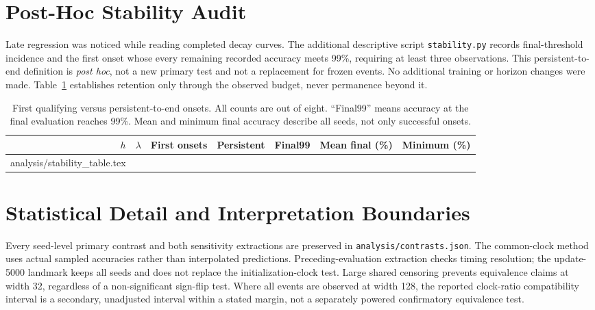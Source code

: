 \documentclass{article}
\makeatletter
\let\inputrows\@@input
\makeatother
\begin{document}
\section{Post-Hoc Stability Audit}\label{app:stability}
Late regression was noticed while reading completed decay curves. The additional descriptive script \texttt{stability.py} records final-threshold incidence and the first onset whose every remaining recorded accuracy meets 99\%, requiring at least three observations. This persistent-to-end definition is \emph{post hoc}, not a new primary test and not a replacement for frozen events. No additional training or horizon changes were made. Table~\ref{tab:stability} establishes retention only through the observed budget, never permanence beyond it.
\begin{table}[ht]\centering\small
\caption{First qualifying versus persistent-to-end onsets. All counts are out of eight. ``Final99'' means accuracy at the final evaluation reaches 99\%. Mean and minimum final accuracy describe all seeds, not only successful onsets.}\label{tab:stability}
\begin{tabular}{r r r r r r r}\toprule
$h$&$\lambda$&First onsets&Persistent&Final99&Mean final (\%)&Minimum (\%)\\\midrule
\inputrows analysis/stability_table.tex
\bottomrule\end{tabular}\end{table}

\section{Statistical Detail and Interpretation Boundaries}
Every seed-level primary contrast and both sensitivity extractions are preserved in \texttt{analysis/contrasts.json}. The common-clock method uses actual sampled accuracies rather than interpolated predictions. Preceding-evaluation extraction checks timing resolution; the update-5000 landmark keeps all seeds and does not replace the initialization-clock test. Large shared censoring prevents equivalence claims at width 32, regardless of a non-significant sign-flip test. Where all events are observed at width 128, the reported clock-ratio compatibility interval is a secondary, unadjusted interval within a stated margin, not a separately powered confirmatory equivalence test.
\end{document}
